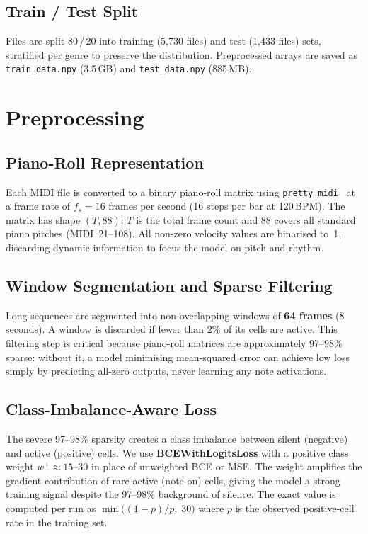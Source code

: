 \documentclass[letterpaper]{article}
\begin{document}
\subsection{Train / Test Split}

Files are split 80\,/\,20 into training (5{,}730 files) and test
(1{,}433 files) sets, stratified per genre to preserve the distribution.
Preprocessed arrays are saved as \texttt{train\_data.npy} (3.5\,GB) and
\texttt{test\_data.npy} (885\,MB).

\section{Preprocessing}
\label{sec:preprocessing}

\subsection{Piano-Roll Representation}

Each MIDI file is converted to a binary piano-roll matrix using
\texttt{pretty\_midi}~\cite{prettymidi} at a frame rate of $f_s = 16$
frames per second (16 steps per bar at 120\,BPM).  The matrix has shape
$(T, 88)$: $T$ is the total frame count and 88 covers all standard piano
pitches (MIDI~21--108).  All non-zero velocity values are binarised to~1,
discarding dynamic information to focus the model on pitch and rhythm.

\subsection{Window Segmentation and Sparse Filtering}

Long sequences are segmented into non-overlapping windows of
\textbf{64 frames} (8 seconds).  A window is discarded if
fewer than 2\% of its cells are active.  This filtering step is critical
because piano-roll matrices are approximately 97--98\% sparse: without it,
a model minimising mean-squared error can achieve low loss simply by
predicting all-zero outputs, never learning any note activations.

\subsection{Class-Imbalance-Aware Loss}

The severe 97--98\% sparsity creates a class imbalance between silent
(negative) and active (positive) cells.  We use \textbf{BCEWithLogitsLoss}
with a positive class weight $w^{+} \approx 15$--30 in place of unweighted
BCE or MSE\@.  The weight amplifies the gradient contribution of rare
active (note-on) cells, giving the model a strong training signal despite
the 97--98\% background of silence.  The exact value is computed per run as
$\min\!\bigl((1-p)/p,\;30\bigr)$ where $p$ is the observed
positive-cell rate in the training set.
\end{document}
